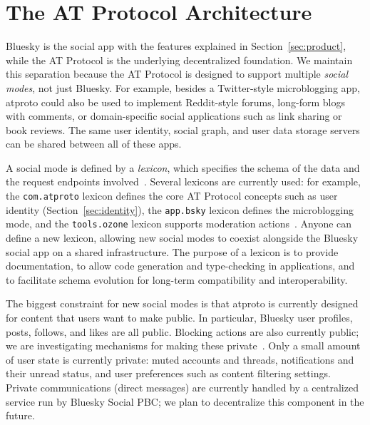 \documentclass[sigconf]{acmart}
\begin{document}
\section{The AT Protocol Architecture}\label{sec:architecture}

Bluesky is the social app with the features explained in Section~\ref{sec:product}, while the AT Protocol is the underlying decentralized foundation.
We maintain this separation because the AT Protocol is designed to support multiple \emph{social modes}, not just Bluesky.
For example, besides a Twitter-style microblogging app, atproto could also be used to implement Reddit-style forums, long-form blogs with comments, or domain-specific social applications such as link sharing or book reviews.
The same user identity, social graph, and user data storage servers can be shared between all of these apps.

A social mode is defined by a \emph{lexicon}, which specifies the schema of the data and the request endpoints involved~\cite{AtProtoSpecs}.
Several lexicons are currently used: for example, the \texttt{com.atproto} lexicon defines the core AT Protocol concepts such as user identity (Section~\ref{sec:identity}), the \texttt{app.bsky} lexicon defines the microblogging mode, and the \texttt{tools.ozone} lexicon supports moderation actions~\cite{BlueskyLexicons}.
Anyone can define a new lexicon, allowing new social modes to coexist alongside the Bluesky social app on a shared infrastructure.
The purpose of a lexicon is to provide documentation, to allow code generation and type-checking in applications, and to facilitate schema evolution for long-term compatibility and interoperability.

The biggest constraint for new social modes is that atproto is currently designed for content that users want to make public.
In particular, Bluesky user profiles, posts, follows, and likes are all public.
Blocking actions are also currently public; we are investigating mechanisms for making these private~\cite{PublicBlocks,PrivateBlocks}.
Only a small amount of user state is currently private: muted accounts and threads, notifications and their unread status, and user preferences such as content filtering settings.
Private communications (direct messages) are currently handled by a centralized service run by Bluesky Social PBC; we plan to decentralize this component in the future.
\end{document}
